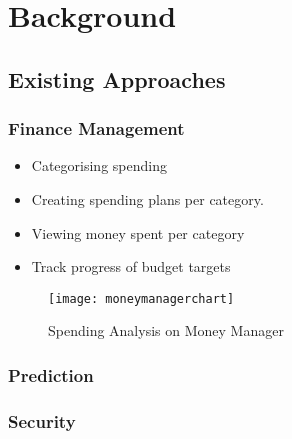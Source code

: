 \chapter{Background}

\begin{comment}
Chapter 2: Background and literature survey
This chapter should give essential background information with references to published material in research papers, books, URLs, magazine articles and even newspapers. Expand on any references to other work that have been mentioned in Chapter 1. Refer to the notes on references (below) for the preferred way of referencing publications. The reader, stimulated by the presentation of ideas in this section, may be led to consult some or all of the referenced publications. This section will be useful for any student in a subsequent year who wishes to take the project further.
\end{comment}

\section{Existing Approaches}

\subsection{Finance Management}

\begin{itemize}
\item Categorising spending
\item Creating spending plans per category.
\item Viewing money spent per category
\item Track progress of budget targets
\end{itemize}

\begin{figure}[h]
    \centering
    \texttt{[image: moneymanagerchart]}
    \caption{Spending Analysis on Money Manager \parencite{lloyds2014money}}
    \label{fig:moneymanager}
\end{figure}

\subsection{Prediction}

\subsection{Security}


